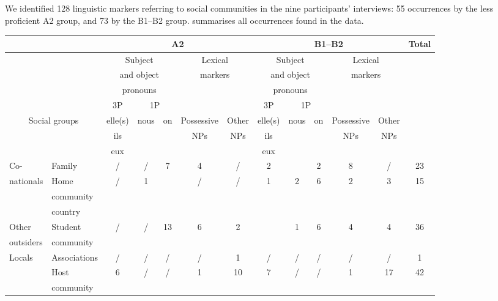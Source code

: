 \documentclass[output=paper]{langscibook}
\begin{document}
We identified 128 linguistic markers referring to social communities in the nine participants’ interviews: 55 occurrences by the less proficient A2 group, and 73 by the B1–B2 group.  summarises all occurrences found in the data.


\begin{sidewaystable}
\small
\begin{tabular}{llccccccccccc}
\lsptoprule
& & \multicolumn{5}{c}{{A2}} & \multicolumn{5}{c}{{B1–B2}} & {Total}\\
\midrule
&  & \multicolumn{3}{c}{{Subject}} & \multicolumn{2}{c}{{Lexical}} & \multicolumn{3}{c}{{Subject}} & \multicolumn{2}{c}{{Lexical}} & \\
&  & \multicolumn{3}{c}{{and object}} & \multicolumn{2}{c}{{markers}} & \multicolumn{3}{c}{{and object}} & \multicolumn{2}{c}{{markers}} & \\
&  & \multicolumn{3}{c}{{pronouns}} & \multicolumn{2}{c}{} & \multicolumn{3}{c}{{pronouns}} & \multicolumn{2}{c}{} & \\
\midrule
 &  & {3P} & \multicolumn{2}{c}{{1P}} &  &  & {3P} & \multicolumn{2}{c}{{1P}} &  &  & \\
\midrule
\multicolumn{2}{c}{{Social groups}} & {elle(s)} & {nous} & {on} & {Possessive} & {Other} & {elle(s)} & {nous} & {on} & {Possessive} & {Other} & \\
& & {ils} & & & {NPs} & {NPs} & {ils} & & & {NPs} & {NPs} & \\
& & {eux} & & & & & {eux} & & & & & \\
\midrule
{Co-} & {Family} & / & / & 7 & 4 & / & 2 &  & 2 & 8 & / & 23\\
{nationals} & {Home} & / & 1 &  & / & / & 1 & 2 & 6 & 2 & 3 & 15\\
& {community} &  &  &  &  &  &  &  &  &  &  & \\
& {country} &  &  &  &  &  &  &  &  &  &  & \\
\midrule
{Other}& {Student} & / & / & 13 & 6 & 2 &  & 1 & 6 & 4 & 4 & 36\\
{outsiders} & {community} &  &  & & & &  &  & & & & \\
\midrule
{Locals} & {Associations} & / & / & / & / & 1 & / & / & / & / & / & 1\\
& {Host} & 6 & / & / & 1 & 10 & 7 & / & / & 1 & 17 & 42\\
& {community} &  &  &  &  &  &  &  &  &  &  & \\

\end{tabular}
\end{sidewaystable}
\end{document}
